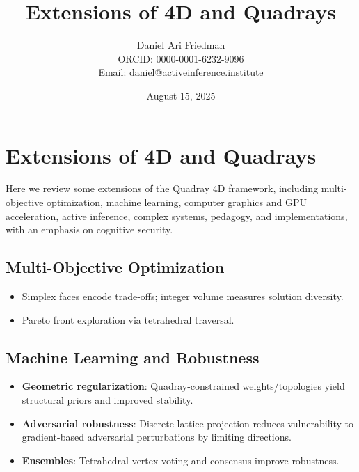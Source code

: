 \documentclass[
  10pt,
]{article}
\title{Extensions of 4D and Quadrays}
\author{Daniel Ari Friedman\\ ORCID: 0000-0001-6232-9096\\ Email: daniel@activeinference.institute}
\date{August 15, 2025}
\providecommand{\tightlist}{%
  \setlength{\itemsep}{0pt}\setlength{\parskip}{0pt}}
\begin{document}
\maketitle

{
\hypersetup{linkcolor=black}
\setcounter{tocdepth}{3}
\tableofcontents
}
\hypertarget{extensions-of-4d-and-quadrays}{%
\section{Extensions of 4D and
Quadrays}\label{extensions-of-4d-and-quadrays}}

Here we review some extensions of the Quadray 4D framework, including
multi-objective optimization, machine learning, computer graphics and
GPU acceleration, active inference, complex systems, pedagogy, and
implementations, with an emphasis on cognitive security.

\hypertarget{multi-objective-optimization}{%
\subsection{Multi-Objective
Optimization}\label{multi-objective-optimization}}

\begin{itemize}
\tightlist
\item
  Simplex faces encode trade-offs; integer volume measures solution
  diversity.
\item
  Pareto front exploration via tetrahedral traversal.
\end{itemize}

\hypertarget{machine-learning-and-robustness}{%
\subsection{Machine Learning and
Robustness}\label{machine-learning-and-robustness}}

\begin{itemize}
\tightlist
\item
  \textbf{Geometric regularization}: Quadray-constrained
  weights/topologies yield structural priors and improved stability.
\item
  \textbf{Adversarial robustness}: Discrete lattice projection reduces
  vulnerability to gradient-based adversarial perturbations by limiting
  directions.
\item
  \textbf{Ensembles}: Tetrahedral vertex voting and consensus improve
  robustness.
\end{itemize}
\end{document}
